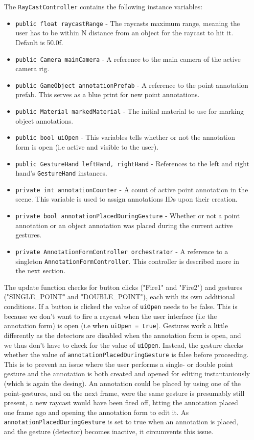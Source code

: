 The \texttt{RayCastController} contains the following instance variables:
\begin{itemize}
\item \texttt{public float raycastRange} - The raycasts maximum range, meaning the user has to be within N distance from an object for the raycast to hit it. Default is 50.0f.                             
\item \texttt{public Camera mainCamera} - A reference to the main camera of the active camera rig.                                       
\item \texttt{public GameObject annotationPrefab} - A reference to the point annotation prefab. This serves as a blue print for new point annotations.
\item \texttt{public Material markedMaterial} - The initial material to use for marking object annotations.
\item \texttt{public bool uiOpen} - This variables tells whether or not the annotation form is open (i.e active and visible to the user).
\item \texttt{public GestureHand leftHand, rightHand} - References to the left and right hand's \texttt{GestureHand} instances.
\item \texttt{private int annotationCounter} - A count of active point annotation in the scene. This variable is used to assign annotations IDs upon their creation.
\item \texttt{private bool annotationPlacedDuringGesture} - Whether or not a point annotation or an object annotation was placed during the current active gestures. 
\item \texttt{private AnnotationFormController orchestrator} - A reference to a singleton \texttt{AnnotationFormController}. This controller is described more in the next section.
\end{itemize}

The update function checks for button clicks ("Fire1" and "Fire2") and gestures ("SINGLE\_POINT" and "DOUBLE\_POINT"), each with its own additional conditions.
If a button is clicked the value of \texttt{uiOpen} needs to be false. This is because we don't want to fire a raycast when the user interface (i.e the annotation form) is 
open (i.e when \texttt{uiOpen = true}). Gestures work a little differently as the detectors are disabled when the annotation form is open, and we thus don't have to check 
for the value of \texttt{uiOpen}.
Instead, the gesture checks whether the value of \texttt{annotationPlacedDuringGesture} is false before proceeding. This is to prevent an issue where the user performs a 
single- or double point gesture and the annotation is both created and opened for editing instantaniously (which is again the desing). An annotation could be placed by 
using one of the point-gestures, and on the next frame, were the same gesture is presumably still present, a new raycast would have been fired off, htting the annotation placed 
one frame ago and opening the annotation form to edit it. As \texttt{annotationPlacedDuringGesture} is set to true when an annotation is placed, and the gesture (detector) 
becomes inactive, it circumvents this issue.


